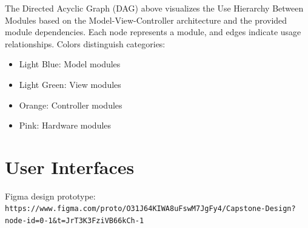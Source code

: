 \documentclass[12pt, titlepage]{article}
\begin{document}
The Directed Acyclic Graph (DAG) above visualizes the Use Hierarchy Between Modules based on the Model-View-Controller architecture and the provided module dependencies. Each node represents a module, and edges indicate usage relationships. Colors distinguish categories:
\begin{itemize}
\item Light Blue: Model modules
\item Light Green: View modules
\item Orange: Controller modules
\item Pink: Hardware modules
\end{itemize}



\section{User Interfaces}
Figma design prototype:
\verb|https://www.figma.com/proto/O31J64KIWA8uFswM7JgFy4/Capstone-Design?node-id=0-1&t=JrT3K3FziVB66kCh-1|


\newpage{}
\end{document}
